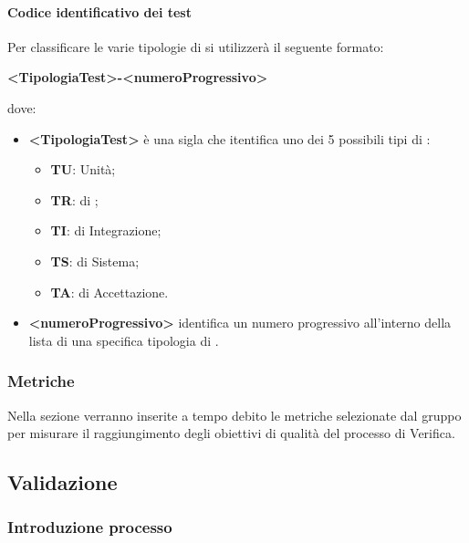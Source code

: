                 \paragraph{Codice identificativo dei test}
                    Per classificare le varie tipologie di  si utilizzerà il seguente formato:
                    \begin{center}
                        \textbf{<TipologiaTest>-<numeroProgressivo>}
                    \end{center}
                    dove:
                    \begin{itemize}
                        \item\textbf{<TipologiaTest> } è una sigla che itentifica uno dei 5 possibili tipi di :
                            \begin{itemize}
                                \item\textbf{TU}:  Unità;
                                \item\textbf{TR}:  di ;
                                \item\textbf{TI}:  di Integrazione;
                                \item\textbf{TS}:  di Sistema;
                                \item\textbf{TA}:  di Accettazione.
                            \end{itemize}
                        \item\textbf{<numeroProgressivo>} identifica un numero progressivo all’interno della lista di una specifica tipologia di .
                    \end{itemize}
        \subsubsection{Metriche}
            Nella sezione verranno inserite a tempo debito le metriche selezionate dal gruppo per misurare il raggiungimento degli obiettivi di qualità del processo di Verifica.

    \subsection{Validazione}
        \subsubsection{Introduzione processo}
